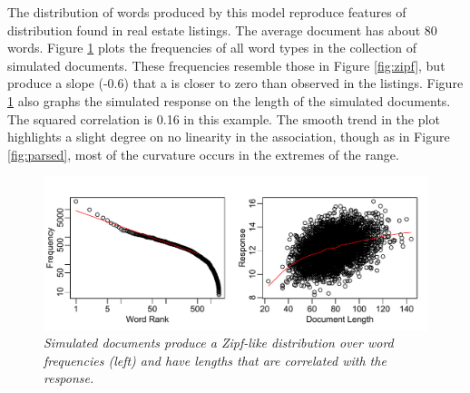 \documentclass[12pt]{article}
\begin{document}
The distribution of words produced by this model  reproduce features of distribution found in real estate listings.  The average document has about 80 words.  Figure \ref{fig:zipfcorr} plots the frequencies of all word types in the collection of simulated documents.  These frequencies resemble those in Figure \ref{fig:zipf}, but produce a slope (-0.6) that a is closer to zero than observed in the listings.  Figure \ref{fig:zipfcorr} also graphs the simulated response on the length of the simulated documents.  The squared correlation is 0.16 in this example.  The smooth trend in the plot highlights a slight degree on no linearity in the association, though as in Figure \ref{fig:parsed}, most of the curvature occurs in the extremes of the range.

\begin{figure}
\caption{ \label{fig:zipfcorr}
{ \sl Simulated documents produce a Zipf-like distribution over word frequencies (left) and have lengths that are correlated with the response.}}
 \centerline{
 \vspace{0.1in}
 \includegraphics[width=7.5in]{figures/zipfcorr} }
 \end{figure}
\end{document}
